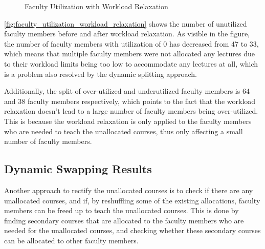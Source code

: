 \begin{figure}[H]
  \centering

  \caption{Faculty Utilization with Workload Relaxation}
  \label{fig:faculty_utilization_workload_relaxation}
\end{figure}

\autoref{fig:faculty_utilization_workload_relaxation} shows the number of unutilized faculty members before and after workload relaxation. As visible in the figure, the number of faculty members with utilization of 0 has decreased from 47 to 33, which means that multiple faculty members were not allocated any lectures due to their workload limits being too low to accommodate any lectures at all, which is a problem also resolved by the dynamic splitting approach.

Additionally, the split of over-utilized and underutilized faculty members is 64 and 38 faculty members respectively, which points to the fact that the workload relaxation doesn't lead to a large number of faculty members being over-utilized. This is because the workload relaxation is only applied to the faculty members who are needed to teach the unallocated courses, thus only affecting a small number of faculty members.


\subsection{Dynamic Swapping Results}
\label{sec:post_allocation}

Another approach to rectify the unallocated courses is to check if there are any unallocated courses, and if, by reshuffling some of the existing allocations, faculty members can be freed up to teach the unallocated courses. This is done by finding secondary courses that are allocated to the faculty members who are needed for the unallocated courses, and checking whether these secondary courses can be allocated to other faculty members.

